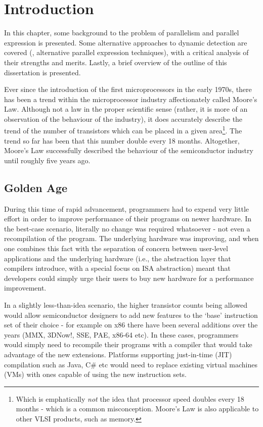 \chapter{Introduction} \label{chp:introduction}
In this chapter, some background to the problem of parallelism and parallel expression is presented. Some alternative approaches to dynamic detection are covered (\ie, alternative parallel expression techniques), with a critical analysis of their strengths and merits. Lastly, a brief overview of the outline of this dissertation is presented.

Ever since the introduction of the first microprocessors in the early 1970s, there has been a trend within the microprocessor industry affectionately called Moore's Law. Although not a law in the proper scientific sense (rather, it is more of an observation of the behaviour of the industry), it does accurately describe the trend of the number of transistors which can be placed in a given area\footnote{Which is emphatically \textit{not} the idea that processor speed doubles every 18 months - which is a common misconception. Moore's Law is also applicable to other VLSI products, such as memory.}. The trend so far has been that this number double every 18 months. Altogether, Moore's Law successfully described the behaviour of the semiconductor industry until roughly five years ago.

\section{Golden Age} \label{sec:introduction/golden-age}
During this time of rapid advancement, programmers had to expend very little effort in order to improve performance of their programs on newer hardware. In the best-case scenario, literally no change was required whatsoever - not even a recompilation of the program. The underlying hardware was improving, and when one combines this fact with the separation of concern between user-level applications and the underlying hardware (i.e., the abstraction layer that compilers introduce, with a special focus on ISA abstraction) meant that developers could simply urge their users to buy new hardware for a performance improvement.

In a slightly less-than-idea scenario, the higher transistor counts being allowed would allow semiconductor designers to add new features to the `base' instruction set of their choice - for example on x86 there have been several additions over the years (MMX, 3DNow!, SSE, PAE, x86-64 etc). In these cases, programmers would simply need to recompile their programs with a compiler that would take advantage of the new extensions. Platforms supporting just-in-time (JIT) compilation such as Java, C\# etc would need to replace existing virtual machines (VMs) with ones capable of using the new instruction sets.

